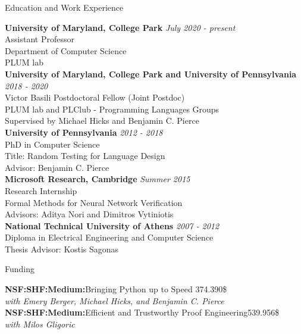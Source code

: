 \documentclass{resume} %
\begin{document}

\newcommand{\edu}[4]{
  {\bf #3} \hfill {\em #2}\\
  {#1}\\
  #4\\
}

\begin{rSection}{Education and Work Experience}

\edu{Assistant Professor}{July 2020 - present}
    {University of Maryland, College Park}
    {Department of Computer Science\\
     PLUM lab}
  
\edu{Victor Basili Postdoctoral Fellow (Joint Postdoc)}{2018 - 2020}
    {University of Maryland, College Park and University of Pennsylvania}{
      PLUM lab and PLClub - Programming Languages Groups\\
      Supervised by Michael Hicks and Benjamin C. Pierce
    }
% 

\edu{PhD in Computer Science}{2012 - 2018}
    {University of Pennsylvania}{
      Title: Random Testing for Language Design\\
      Advisor: Benjamin C. Pierce
    }
    
\edu{Research Internship}{Summer 2015}
    {Microsoft Research, Cambridge}{
      Formal Methods for Neural Network Verification\\
      Advisors: Aditya Nori and Dimitros Vytiniotis
    }

\edu{Diploma in Electrical Engineering and Computer Science}{2007 - 2012}
    {National Technical University of Athens}
    {
      Thesis Advisor: Kostis Sagonas
     }

%    
\end{rSection}


\begin{rSection}{Funding}
  
  {\bf NSF:SHF:Medium:}Bringing Python up to Speed \hfill{374.390\$}\\
  {\em with Emery Berger, Michael Hicks, and Benjamin C. Pierce}\\

  {\bf NSF:SHF:Medium:}{Efficient and Trustworthy Proof Engineering}\hfill{539.956\$}\\
  {\em with Milos Gligoric}\\
  
\end{rSection}
\end{document}
